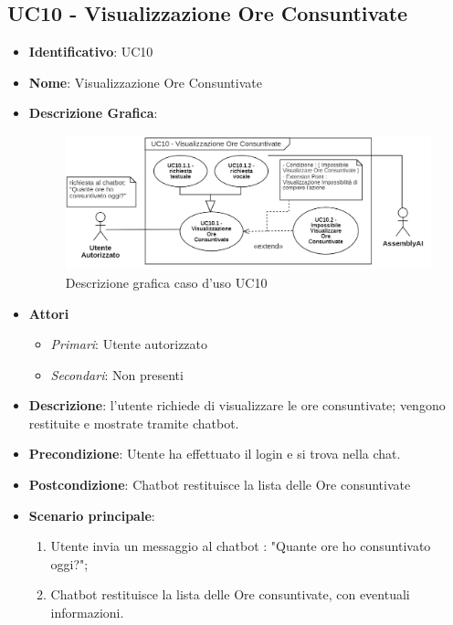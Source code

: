 \subsection{UC10 - Visualizzazione Ore Consuntivate }
\begin{itemize}
	\item \textbf{Identificativo}: UC10
	\item \textbf{Nome}: Visualizzazione Ore Consuntivate
	\item\textbf{Descrizione Grafica}: 
	\begin{figure}[h]
		\centering
		\includegraphics[scale=0.60]{images/UC10.png} 
		\caption{Descrizione grafica caso d'uso UC10}
	 \end{figure}

	\item \textbf{Attori}
	\begin{itemize} 
		\item \textit{Primari}: Utente autorizzato
		\item \textit{Secondari}: Non presenti
	\end{itemize}
	\item \textbf{Descrizione}: l'utente richiede di visualizzare le ore consuntivate; vengono restituite e mostrate tramite chatbot.
	\item \textbf{Precondizione}: Utente ha effettuato il login e si trova nella chat.
	\item \textbf{Postcondizione}: Chatbot restituisce la lista delle Ore consuntivate
	\item \textbf{Scenario principale}:  
		\begin{enumerate}
			\item Utente invia un messaggio al chatbot : "Quante ore ho consuntivato oggi?";
			\item Chatbot restituisce la lista delle Ore consuntivate, con eventuali informazioni.
		\end{enumerate}
\end{itemize}


